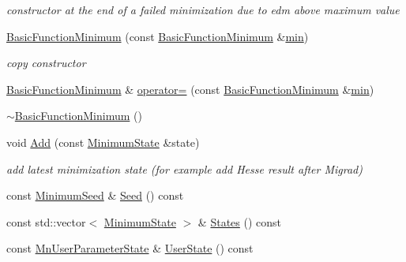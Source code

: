 \begin{DoxyCompactItemize}
\begin{DoxyCompactList}\small\item\em constructor at the end of a failed minimization due to edm above maximum value \end{DoxyCompactList}\item 
\mbox{\hyperlink{classROOT_1_1Minuit2_1_1BasicFunctionMinimum_ae0812dcb933989ffd9e096792367d0b7}{Basic\+Function\+Minimum}} (const \mbox{\hyperlink{classROOT_1_1Minuit2_1_1BasicFunctionMinimum}{Basic\+Function\+Minimum}} \&\mbox{\hyperlink{SU3__internal_8h_ab0f5fed3171eb00d1c5f037d9f518a23}{min}})
\begin{DoxyCompactList}\small\item\em copy constructor \end{DoxyCompactList}\item 
\mbox{\hyperlink{classROOT_1_1Minuit2_1_1BasicFunctionMinimum}{Basic\+Function\+Minimum}} \& \mbox{\hyperlink{classROOT_1_1Minuit2_1_1BasicFunctionMinimum_ad143c1c314e041649151bac9bb9e7a91}{operator=}} (const \mbox{\hyperlink{classROOT_1_1Minuit2_1_1BasicFunctionMinimum}{Basic\+Function\+Minimum}} \&\mbox{\hyperlink{SU3__internal_8h_ab0f5fed3171eb00d1c5f037d9f518a23}{min}})
\item 
\mbox{\hyperlink{classROOT_1_1Minuit2_1_1BasicFunctionMinimum_a8ed0b5582b668d53022197f2540df4e7}{$\sim$\+Basic\+Function\+Minimum}} ()
\item 
void \mbox{\hyperlink{classROOT_1_1Minuit2_1_1BasicFunctionMinimum_abd32f932e7a26883723b33c4a1402a85}{Add}} (const \mbox{\hyperlink{classROOT_1_1Minuit2_1_1MinimumState}{Minimum\+State}} \&state)
\begin{DoxyCompactList}\small\item\em add latest minimization state (for example add Hesse result after Migrad) \end{DoxyCompactList}\item 
const \mbox{\hyperlink{classROOT_1_1Minuit2_1_1MinimumSeed}{Minimum\+Seed}} \& \mbox{\hyperlink{classROOT_1_1Minuit2_1_1BasicFunctionMinimum_a925aba07b861d7b3d1e5386411a5ea2f}{Seed}} () const
\item 
const std\+::vector$<$ \mbox{\hyperlink{classROOT_1_1Minuit2_1_1MinimumState}{Minimum\+State}} $>$ \& \mbox{\hyperlink{classROOT_1_1Minuit2_1_1BasicFunctionMinimum_a89080776340dc1cad0d73357a6c4b401}{States}} () const
\item 
const \mbox{\hyperlink{classROOT_1_1Minuit2_1_1MnUserParameterState}{Mn\+User\+Parameter\+State}} \& \mbox{\hyperlink{classROOT_1_1Minuit2_1_1BasicFunctionMinimum_ac1757a094afe32c23b548fafaff5acc1}{User\+State}} () const

\end{DoxyCompactItemize}

